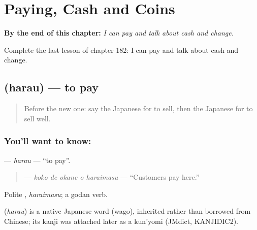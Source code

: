 
\chapter{Paying, Cash and Coins}
\label{ch:ja-paying-cash-and-coins}

\begin{chapteropening}
\textbf{By the end of this chapter:} \emph{I can pay and talk about cash and change.}

Complete the last lesson of chapter 182: I can pay and talk about cash and change.
\end{chapteropening}

\section[\texorpdfstring{\ja{はらう} (harau)}{はらう (harau)}]{ (harau) — to pay}

\label{lesson:JA-C182-harau}



\begin{quote}
Before the new one: say the Japanese for to sell, then the Japanese for to sell well.
\end{quote}

\subsection*{You'll want to know: }
\textbf{} — \emph{harau} — \textquotedblleft{}to pay\textquotedblright{}.

\begin{quote}
\textbf{  } — \emph{koko de okane o haraimasu} — \textquotedblleft{}Customers pay here.\textquotedblright{}
\end{quote}

Polite \textbf{}, \emph{haraimasu}; a godan verb.

\begin{cousinweb}
\textbf{} (\emph{harau}) is a native Japanese word (wago), inherited rather than borrowed from Chinese; its kanji was attached later as a kun'yomi (JMdict, KANJIDIC2).
\end{cousinweb}

